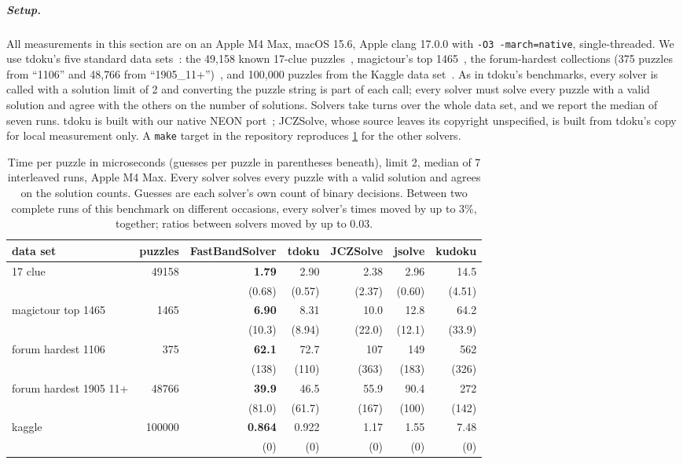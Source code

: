\documentclass[a4paper,USenglish,cleveref,anonymous]{lipics-v2021}
\newif\ifanon
\newcommand{\selfcite}[1]{\ifanon[anonymized]\else\cite{#1}\fi}
\begin{document}
\subparagraph{Setup.} All measurements in this section are on an Apple M4 Max, macOS 15.6, Apple clang 17.0.0 with
\texttt{-O3 -march=native}, single-threaded. We use tdoku's five standard data sets~\cite{dillon2019nerdsniped}: the
49{,}158 known 17-clue puzzles~\cite{royle17clue,champagne2022all17}, magictour's top
1465~\cite{stertenbrink2005top1465}, the forum-hardest collections (375 puzzles from ``1106'' and 48{,}766 from
``1905\_11+'')~\cite{forumhardest}, and 100{,}000 puzzles from the Kaggle data set~\cite{park2016kaggle}. As in tdoku's
benchmarks, every solver is called with a solution limit of 2 and converting the puzzle string is part of each call;
every solver must solve every puzzle with a valid solution and agree with the others on the number of solutions.
Solvers take turns over the whole data set, and we report the median of seven runs. tdoku is built with our native
NEON port~\selfcite{kelly2026tdokuarm}; JCZSolve, whose source leaves its copyright unspecified, is built from tdoku's copy
for local measurement only. A \texttt{make} target in the repository reproduces \cref{tab:sota} for the other solvers.

\begin{table}[t]
\centering
\caption{Time per puzzle in microseconds (guesses per puzzle in parentheses beneath), limit 2, median of 7 interleaved runs, Apple M4 Max.
Every solver solves every puzzle with a valid solution and agrees on the solution counts. Guesses are each solver's
own count of binary decisions. Between two complete runs of this benchmark on different occasions, every solver's
times moved by up to 3\%, together; ratios between solvers moved by up to 0.03.}
\label{tab:sota}
\small
\setlength{\tabcolsep}{4pt}
\begin{tabular}{lrrrrrr}
\toprule
data set & puzzles & FastBandSolver & tdoku & JCZSolve & jsolve & kudoku \\
\midrule
17 clue & 49158 & \textbf{1.79} & 2.90 & 2.38 & 2.96 & 14.5 \\
&& (0.68) & (0.57) & (2.37) & (0.60) & (4.51) \\[2pt]
magictour top 1465 & 1465 & \textbf{6.90} & 8.31 & 10.0 & 12.8 & 64.2 \\
&& (10.3) & (8.94) & (22.0) & (12.1) & (33.9) \\[2pt]
forum hardest 1106 & 375 & \textbf{62.1} & 72.7 & 107 & 149 & 562 \\
&& (138) & (110) & (363) & (183) & (326) \\[2pt]
forum hardest 1905 11+ & 48766 & \textbf{39.9} & 46.5 & 55.9 & 90.4 & 272 \\
&& (81.0) & (61.7) & (167) & (100) & (142) \\[2pt]
kaggle & 100000 & \textbf{0.864} & 0.922 & 1.17 & 1.55 & 7.48 \\
&& (0) & (0) & (0) & (0) & (0) \\[2pt]
\bottomrule
\end{tabular}
\end{table}
\end{document}
